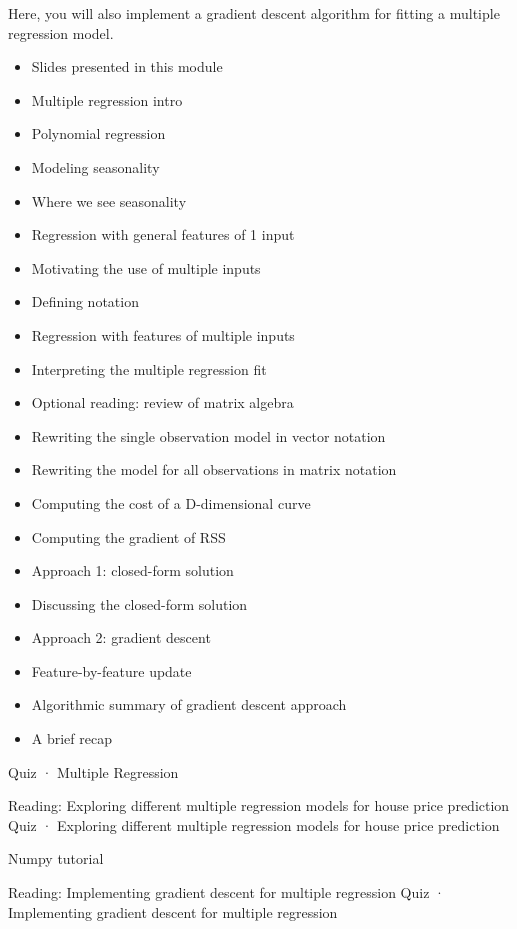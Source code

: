 Here, you will also implement a gradient descent algorithm for fitting a multiple regression model.
\begin{itemize}
\item Slides presented in this module
\item Multiple regression intro
\item Polynomial regression
\item Modeling seasonality
\item Where we see seasonality
\item Regression with general features of 1 input
\item Motivating the use of multiple inputs
\item Defining notation
\item Regression with features of multiple inputs
\item Interpreting the multiple regression fit
\item Optional reading: review of matrix algebra
\item Rewriting the single observation model in vector notation
\item Rewriting the model for all observations in matrix notation
\item Computing the cost of a D-dimensional curve
\item Computing the gradient of RSS
\item Approach 1: closed-form solution
\item Discussing the closed-form solution
\item Approach 2: gradient descent
\item Feature-by-feature update
\item Algorithmic summary of gradient descent approach
\item A brief recap
\end{itemize}
Quiz · Multiple Regression
\item Reading: Exploring different multiple regression models for house price prediction
Quiz · Exploring different multiple regression models for house price prediction
\item Numpy tutorial
\item Reading: Implementing gradient descent for multiple regression
Quiz · Implementing gradient descent for multiple regression

